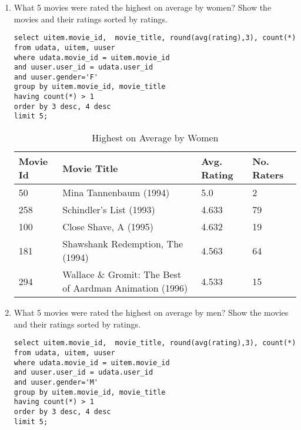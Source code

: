 \documentclass[letterpaper,11pt]{report}
\begin{document}
\begin{savenotes}
\begin{enumerate}
\item What 5 movies were rated the highest on average by women? Show the movies and their ratings sorted by ratings.

\begin{verbatim}
select uitem.movie_id,  movie_title, round(avg(rating),3), count(*) 
from udata, uitem, uuser 
where udata.movie_id = uitem.movie_id 
and uuser.user_id = udata.user_id 
and uuser.gender='F' 
group by uitem.movie_id, movie_title 
having count(*) > 1 
order by 3 desc, 4 desc 
limit 5;
\end{verbatim}

\begin{table}[htbp]
\centering
    \begin{tabular}{|l|l|l|l|}
    \hline
    Movie Id & Movie Title                                             & Avg. Rating & No. Raters \\ \hline
    50       & Mina Tannenbaum (1994)                                  & 5.0         & 2          \\ \hline
    258      & Schindler's List (1993)                                 & 4.633       & 79         \\ \hline
    100      & Close Shave, A (1995)                                   & 4.632       & 19         \\ \hline
    181      & Shawshank Redemption, The (1994)                        & 4.563       & 64         \\ \hline
    294      & Wallace \& Gromit: The Best of Aardman Animation (1996) & 4.533       & 15         \\ \hline
    \end{tabular}
    \caption {Highest on Average by Women}
		\label{tab:HighWomen}
\end{table}

\item What 5 movies were rated the highest on average by men? Show the movies and their ratings sorted by ratings.

\begin{verbatim}
select uitem.movie_id,  movie_title, round(avg(rating),3), count(*) 
from udata, uitem, uuser 
where udata.movie_id = uitem.movie_id 
and uuser.user_id = udata.user_id 
and uuser.gender='M' 
group by uitem.movie_id, movie_title 
having count(*) > 1 
order by 3 desc, 4 desc 
limit 5;
\end{verbatim}


\end{enumerate}
\end{savenotes}
\end{document}

